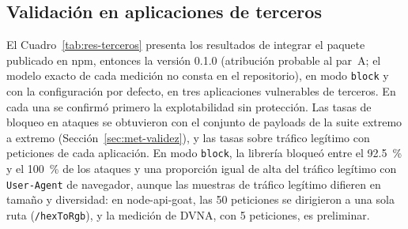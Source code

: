 \subsection{Validación en aplicaciones de terceros}
\label{subsec:res-og-terceros}

El Cuadro~\ref{tab:res-terceros} presenta los resultados de integrar el paquete publicado en npm, entonces la versión 0.1.0 (atribución
probable al par~A; el modelo exacto de cada medición no consta en el repositorio), en modo \texttt{block} y con la configuración por defecto, en tres aplicaciones vulnerables de
terceros. En cada una se confirmó primero la explotabilidad sin protección. Las tasas de bloqueo en
ataques se obtuvieron con el conjunto de payloads de la suite extremo a extremo
(Sección~\ref{sec:met-validez}), y las tasas sobre tráfico legítimo con peticiones de cada
aplicación. En modo \texttt{block}, la librería bloqueó entre el 92.5~\% y el 100~\% de los ataques y una proporción igual
de alta del tráfico legítimo con \texttt{User-Agent} de navegador, aunque las muestras de tráfico legítimo difieren en tamaño y
diversidad: en node-api-goat, las 50 peticiones se dirigieron a una sola ruta
(\texttt{/hexToRgb}), y la medición de DVNA, con 5 peticiones, es preliminar.

